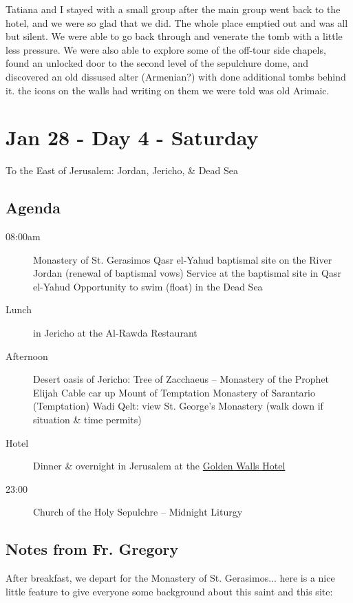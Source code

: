 \documentclass[letterpaper]{report}
\begin{document}
Tatiana and I stayed with a small group after the main group went back to the hotel,
and we were so glad that we did.
The whole place emptied out and was all but silent.
We were able to go back through and venerate the tomb with a little less pressure.
We were also able to explore some of the off-tour side chapels,
found an unlocked door to the second level of the sepulchure dome,
and discovered an old dissused alter (Armenian?) with done additional tombs behind it. the icons on the walls had writing on them we were told was old Arimaic.


\clearpage
\section{Jan 28 - Day 4 - Saturday}
To the East of Jerusalem: Jordan, Jericho, \& Dead Sea

\subsection{Agenda}
\begin{description}
	\item[08:00am]  Monastery of St. Gerasimos
	  \subitem Qasr el-Yahud baptismal site on the River Jordan
	    (renewal of baptismal vows)
	  \subitem Service at the baptismal site in Qasr el-Yahud
	  \subitem Opportunity to swim (float) in the Dead Sea
	\item[Lunch] in Jericho at the Al-Rawda Restaurant 
	\item[Afternoon] Desert oasis of Jericho: Tree of Zacchaeus – Monastery of the Prophet Elijah
	  \subitem Cable car up Mount of Temptation
	  \subitem Monastery of Sarantario (Temptation)
	  \subitem Wadi Qelt: view St. George's Monastery (walk down if situation \& time permits) 
	\item[Hotel] Dinner \& overnight in Jerusalem at the
	  \href{http://goldenwalls.com/}{Golden Walls Hotel}
	\item[23:00]  Church of the Holy Sepulchre – Midnight Liturgy
\end{description}

\subsection{Notes from Fr. Gregory}
After breakfast, we depart for the Monastery of St. Gerasimos...
here is a nice little feature to give everyone some background about this
saint and this site:
\end{document}
